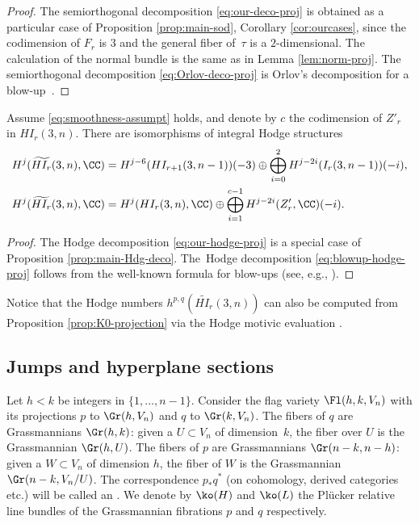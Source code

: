 \begin{proof}
The semiorthogonal decomposition \eqref{eq:our-deco-proj} is obtained as a particular case of Proposition \ref{prop:main-sod}, Corollary \ref{cor:ourcases}, since the codimension of $F_r$ is $3$ and the general fiber of~$\tau$ is a $2$-dimensional. The calculation of the normal bundle is the same as in Lemma \ref{lem:norm-proj}. The semiorthogonal decomposition \eqref{eq:Orlov-deco-proj} is Orlov's decomposition
for a blow-up~\cite{orlovprojbund}.
\end{proof}

\begin{prop}\label{prop:Hodge-projection}
Assume \eqref{eq:smoothness-assumpt} holds, and denote by $c$ the codimension of $Z'_r$ in $HI_r(3,n)$. There are isomorphisms of integral Hodge structures
\begin{align}\label{eq:our-hodge-proj}
H^j(\widetilde{HI_r}(3,n),\CC) &= H^{j-6}(HI_{r+1}(3,n-1))(-3) \oplus \bigoplus_{i=0}^2 H^{j-2i}(I_r(3,n-1))(-i),
\\
\label{eq:blowup-hodge-proj}
H^j(\widetilde{HI_r}(3,n),\CC) &= H^j(HI_r(3,n),\CC) \oplus \bigoplus_{i=1}^{c-1} H^{j-2i}(Z'_r,\CC)(-i).
\end{align}
\end{prop}

\begin{proof}
The Hodge decomposition \eqref{eq:our-hodge-proj} is a special case of Proposition \ref{prop:main-Hdg-deco}. The~Hodge decomposition \eqref{eq:blowup-hodge-proj} follows
from the well-known formula for blow-ups (see, e.g., \hbox{\cite[7.7.3]{voisin-book}}).
\end{proof}

Notice that the Hodge numbers $h^{p,q}(\widetilde{HI_r}(3,n))$ can also be computed from
Proposition \ref{prop:K0-projection} via the Hodge motivic evaluation \cite[\S 3.2]{craw}.

\subsection{Jumps and hyperplane sections}

Let $h<k$ be integers in $\{1,\ldots,n-1\}$.
Consider the flag variety $\Fl(h,k,V_n)$ with its projections $p$ to $\Gr(h,V_n)$ and $q$
to $\Gr(k,V_n)$. The fibers of $q$ are Grassmannians $\Gr(h,k)$: given a $U \subset V_n$ of dimension~$k$, the fiber over $U$ is the Grassmannian $\Gr(h,U)$. The fibers of
$p$ are Grassmannians $\Gr(n-k,n-h)$: given a $W \subset V_n$ of dimension $h$, the fiber of $W$ is the Grassmannian $\Gr(n-k,V_n/U)$. The correspondence $p_*q^*$ (on cohomology, derived categories etc.)
will be called an . We denote by $\ko(H)$ and $\ko(L)$ the Plücker
relative line bundles of the Grassmannian fibrations $p$ and $q$ respectively.

